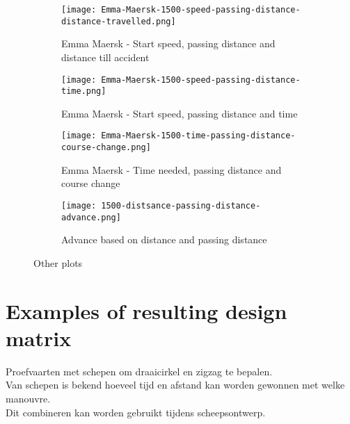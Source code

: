 \begin{figure}[ht]
	\begin{subfigure}[b]{0.5\linewidth}
		\texttt{[image: Emma-Maersk-1500-speed-passing-distance-distance-travelled.png]} 
		\caption{Emma Maersk - Start speed, passing distance and distance till accident} 
	\end{subfigure} 
	\begin{subfigure}[b]{0.5\linewidth}
		\texttt{[image: Emma-Maersk-1500-speed-passing-distance-time.png]} 
		\caption{Emma Maersk - Start speed, passing distance and time} 
	\end{subfigure} 
	\begin{subfigure}[b]{0.5\linewidth}
		\texttt{[image: Emma-Maersk-1500-time-passing-distance-course-change.png]} 
		\caption{Emma Maersk - Time needed, passing distance and course change} 
	\end{subfigure}
	\hfill
	\begin{subfigure}[b]{0.5\linewidth}
		\texttt{[image: 1500-distsance-passing-distance-advance.png]} 
		\caption{Advance based on distance and passing distance} 
	\end{subfigure}
	\caption{Other plots} 
	\label{fig:other-trial-example-plots} 
\end{figure}

\section{Examples of resulting design matrix}
Proefvaarten met schepen om draaicirkel en zigzag te bepalen.\\
Van schepen is bekend hoeveel tijd en afstand kan worden gewonnen met welke manouvre.\\
Dit combineren kan worden gebruikt tijdens scheepsontwerp.\\
